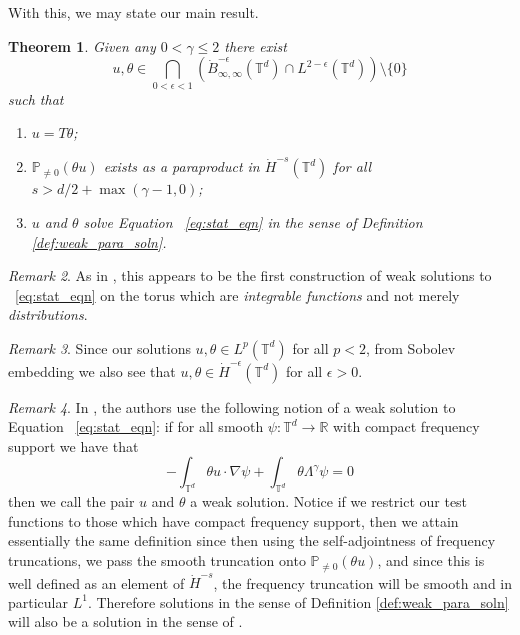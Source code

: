 \documentclass[12pt,reqno,letterpaper]{amsart}
\numberwithin{equation}{section}
\newcommand{\1}{{\bf 1}}
\newcommand{\2}{{\bf 2}}
\newcommand{\R}{\mathbb R}
\newcommand{\T}{\mathbb T}
\newtheorem{theorem}{Theorem}[section]
\theoremstyle{remark}
\newtheorem{remark}[theorem]{Remark}
\theoremstyle{remark}
\begin{document}
With this, we may state our main result.

\begin{theorem}\label{thm:main}
    Given any $0 < \gamma \leq 2$ there exist
    $$
    u,\theta \in \bigcap_{0 < \epsilon < 1} \left(\dot{B}_{\infty,\infty}^{-\epsilon}(\T^d) \cap L^{2-\epsilon}(\T^d)\right) \setminus \{0\}
    $$
    such that
    \begin{enumerate}
        \item [(a)] $u = T\theta$;
        \item [(b)] $\mathbb{P}_{\not=0}(\theta u)$ exists as a paraproduct in $\dot{H}^{-s}(\T^d)$ for all $s > d/2 + \max(\gamma - 1, 0)$;
        \item [(c)] $u$ and $\theta$ solve Equation ~\eqref{eq:stat_eqn} in the sense of Definition \ref{def:weak_para_soln}.
    \end{enumerate}
\end{theorem}

\begin{remark}
    As in \cite{GR}, this appears to be the first construction of weak solutions to ~\eqref{eq:stat_eqn} on the torus which are \textit{integrable functions} and not merely \textit{distributions}.
\end{remark}

\begin{remark}
    Since our solutions $u,\theta \in L^p(\T^d)$ for all $p < 2$, from Sobolev embedding we also see that $u,\theta \in \dot{H}^{-\epsilon}(\T^d)$ for all $\epsilon > 0$.
\end{remark}

\begin{remark}
    In \cite{DW}, the authors use the following notion of a weak solution to Equation ~\eqref{eq:stat_eqn}: if for all smooth $\psi:\T^d \to \R$ with compact frequency support we have that
    \begin{equation}\label{eq:DW_soln_def}
        - \int_{\T^d} \theta u \cdot \nabla \psi + \int_{\T^d} \theta \Lambda^\gamma \psi = 0
    \end{equation}
    then we call the pair $u$ and $\theta$ a weak solution. Notice if we restrict our test functions to those which have compact frequency support, then we attain essentially the same definition since then using the self-adjointness of frequency truncations, we pass the smooth truncation onto $\mathbb{P}_{\not=0}(\theta u)$, and since this is well defined as an element of $\dot{H}^{-s}$, the frequency truncation will be smooth and in particular $L^1$. Therefore solutions in the sense of Definition \ref{def:weak_para_soln} will also be a solution in the sense of \cite[Definition 1.1]{DW}.
\end{remark}
\end{document}
